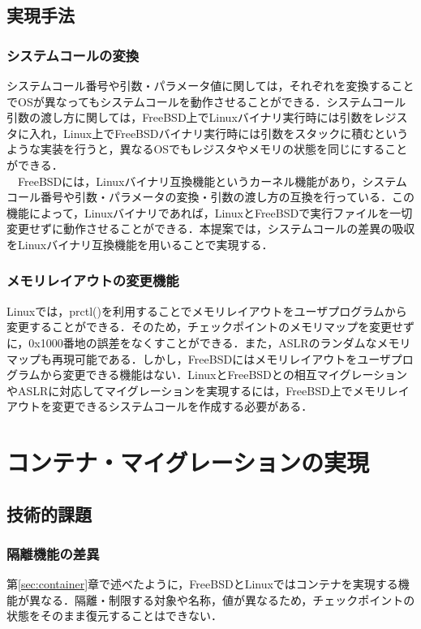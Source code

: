 \documentclass[11pt]{jarticle}
\begin{document}
\subsection{実現手法}
\subsubsection{システムコールの変換}
システムコール番号や引数・パラメータ値に関しては，それぞれを変換することでOSが異なってもシステムコールを動作させることができる．システムコール引数の渡し方に関しては，FreeBSD上でLinuxバイナリ実行時には引数をレジスタに入れ，Linux上でFreeBSDバイナリ実行時には引数をスタックに積むというような実装を行うと，異なるOSでもレジスタやメモリの状態を同じにすることができる．\\
　FreeBSDには，Linuxバイナリ互換機能\cite{linux-emu}というカーネル機能があり，システムコール番号や引数・パラメータの変換・引数の渡し方の互換を行っている．この機能によって，Linuxバイナリであれば，LinuxとFreeBSDで実行ファイルを一切変更せずに動作させることができる．本提案では，システムコールの差異の吸収をLinuxバイナリ互換機能を用いることで実現する．

\subsubsection{メモリレイアウトの変更機能}
Linuxでは，prctl()を利用することでメモリレイアウトをユーザプログラムから変更することができる．そのため，チェックポイントのメモリマップを変更せずに，0x1000番地の誤差をなくすことができる．また，ASLRのランダムなメモリマップも再現可能である．しかし，FreeBSDにはメモリレイアウトをユーザプログラムから変更できる機能はない．LinuxとFreeBSDとの相互マイグレーションやASLRに対応してマイグレーションを実現するには，FreeBSD上でメモリレイアウトを変更できるシステムコールを作成する必要がある．

\section{コンテナ・マイグレーションの実現}
\label{sec:CM}
\subsection{技術的課題}
\subsubsection{隔離機能の差異}
第\ref{sec:container}章で述べたように，FreeBSDとLinuxではコンテナを実現する機能が異なる．隔離・制限する対象や名称，値が異なるため，チェックポイントの状態をそのまま復元することはできない．
\end{document}
